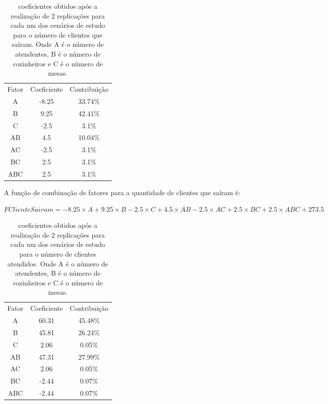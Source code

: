 \documentclass[pt,disc,oneside]{ufscpgeasthesis}
\begin{document}
			\begin{table}[!ht]
				\centering
				\begin{tabular}{c|c|c}
					\rowcolor{gray!70} Fator 	& Coeficiente 	& Contribuição 	\\
					\rowcolor{gray!20} A 		& -8.25			& 33.74\%		\\
					\rowcolor{gray!40} B 		& 9.25			& 42.41\%		\\
					\rowcolor{gray!20} C 		& -2.5			& 3.1\%			\\
					\rowcolor{gray!40} AB 		& 4.5			& 10.04\%		\\
					\rowcolor{gray!20} AC 		& -2.5 			& 3.1\%			\\
					\rowcolor{gray!40} BC 		& 2.5			& 3.1\%			\\
					\rowcolor{gray!20} ABC 		& 2.5			& 3.1\%			\\
				\end{tabular}
				\caption{coeficientes obtidos após a realização de 2 replicações para cada um dos cenários de estudo para o número de clientes que saíram. Onde A é o número de atendentes, B é o número de cozinheiros e C é o número de mesas.}
				\label{table:results2}
			\end{table}

			A função de combinação de fatores para a quantidade de clientes que saíram é:

			\begin{center}
				\large{$FClienteSairam = -8.25 \times A + 9.25 \times B - 2.5 \times C + 4.5 \times AB - 2.5 \times AC + 2.5 \times BC + 2.5 \times ABC + 273.5$}
			\end{center}

			\begin{table}[!ht]
				\centering
				\begin{tabular}{c|c|c}
					\rowcolor{gray!70} Fator 	& Coeficiente 	& Contribuição 	\\
					\rowcolor{gray!20} A 		& 60.31			& 45.48\%		\\
					\rowcolor{gray!40} B 		& 45.81			& 26.24\%		\\
					\rowcolor{gray!20} C 		& 2.06			& 0.05\%		\\
					\rowcolor{gray!40} AB 		& 47.31			& 27.99\%		\\
					\rowcolor{gray!20} AC 		& 2.06			& 0.05\%		\\
					\rowcolor{gray!40} BC 		& -2.44			& 0.07\%		\\
					\rowcolor{gray!20} ABC 		& -2.44			& 0.07\%		\\
				\end{tabular}
				\caption{coeficientes obtidos após a realização de 2 replicações para cada um dos cenários de estudo para o número de clientes atendidos. Onde A é o número de atendentes, B é o número de cozinheiros e C é o número de mesas.}
				\label{table:results3}
			\end{table}
\end{document}
